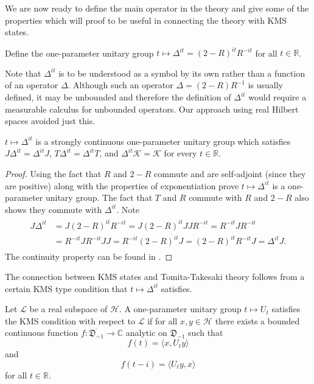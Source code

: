 We are now ready to define the main operator in the theory and give some of the properties which will proof to be useful in connecting the theory with KMS states.

\begin{definition}
Define the one-parameter unitary group $t\mapsto\Delta^{it} = (2-R)^{it}R^{-it}$ for all $t\in\mathbb{R}$.
\end{definition}

Note that $\Delta^{it}$ is to be understood as a symbol by its own rather than a function of an operator $\Delta$. Although such an operator $\Delta=(2-R)R^{-1}$ is usually defined, it may be unbounded and therefore the definition of $\Delta^{it}$ would require a measurable calculus for unbounded operators. Our approach using real Hilbert spaces avoided just this.

\begin{theorem}
$t\mapsto\Delta^{it}$ is a strongly continuous one-parameter unitary group which satisfies $J\Delta^{it}=\Delta^{it}J$, $T\Delta^{it}=\Delta^{it}T$, and $\Delta^{it}\mathcal{K}=\mathcal{K}$ for every $t\in\mathbb{R}$.
\end{theorem}

\begin{proof}
Using the fact that $R$ and $2-R$ commute and are self-adjoint (since they are positive) along with the properties of exponentiation prove $t\mapsto\Delta^{it}$ is a one-parameter unitary group. The fact that $T$ and $R$ commute with $R$ and $2-R$ also shows they commute with $\Delta^{it}$. Note
\begin{align}
\begin{split}
J\Delta^{it}&=J(2-R)^{it}R^{-it}=J(2-R)^{it}JJR^{-it}=R^{-it}JR^{-it} \\
&=R^{-it}JR^{-it}JJ=R^{-it}(2-R)^{it}J=(2-R)^{it} R^{-it}J=\Delta^{it}J.
\end{split}
\end{align}
The continuity property can be found in \cite{Duvenhage1999}.
\end{proof}

The connection between KMS states and Tomita-Takesaki theory follows from a certain KMS type condition that $t\mapsto\Delta^{it}$ satisfies.

\begin{definition}
Let $\mathcal{L}$ be a real subspace of $\mathcal{H}$. A one-parameter unitary group $t\mapsto U_t$ satisfies the KMS condition with respect to $\mathcal{L}$ if for all $x,y\in\mathcal{H}$ there exists a bounded continuous function $f:\overline{\mathfrak{D}_{-1}}\rightarrow\mathbb{C}$ analytic on $\mathfrak{D}_{-1}$ such that 
\begin{equation}
f(t) = \langle x, U_t y\rangle
\end{equation}
and
\begin{equation}
f(t-i)=\langle U_t y, x\rangle 
\end{equation}
for all $t\in\mathbb{R}$. 
\end{definition}

